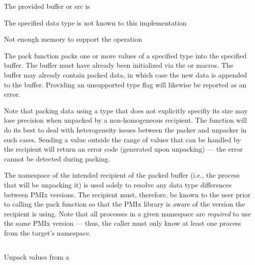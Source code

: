 \returnstart
\begin{constantdesc}
\item {} The provided buffer or src is 
\item {} The specified data type is not known to this implementation
\item {} Not enough memory to support the operation
\end{constantdesc}
\returnend

\descr

The pack function packs one or more values of a specified type into the specified buffer.  The buffer must have already been
initialized via the  or 
macros.
The buffer may already contain packed data, in which case the new data is appended to the buffer.
Providing an unsupported type flag will likewise be reported as an error.

Note that packing data using a type that 
does not explicitly specifiy its size
may lose precision when unpacked
by a non-homogeneous recipient.  The  function will do its best to deal
with heterogeneity issues between the packer and unpacker in such
cases. Sending a value outside the range of values that can be handled by the recipient
will return an error code (generated upon unpacking) ---
the error cannot be detected during packing.

The namespace of the intended recipient of the packed buffer (i.e., the
process that will be unpacking it) is used solely to resolve any data type
differences between \ac{PMIx} versions. The recipient must, therefore, be
known to the user prior to calling the pack function so that the
\ac{PMIx} library is aware of the version the recipient is using. Note that
all processes in a given namespace are \textit{required} to use the same \ac{PMIx}
version --- thus, the caller must only know at least one process from the
target's namespace.


\subsection{}

\summary

Unpack values from a 

